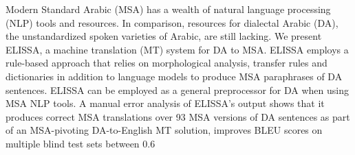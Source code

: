 Modern Standard Arabic (MSA) has a wealth of natural language processing (NLP) tools
 and resources. In comparison, resources for
 dialectal Arabic (DA), the unstandardized spoken
 varieties of Arabic, are still lacking. We
 present ELISSA, a machine translation (MT)
 system for DA to MSA. ELISSA employs a
 rule-based approach that relies on morphological
 analysis, transfer rules and dictionaries
 in addition to language models to produce
 MSA paraphrases of DA sentences. ELISSA
 can be employed as a general preprocessor for
 DA when using MSA NLP tools. A manual
 error analysis of ELISSA's output shows
 that it produces correct MSA translations over
 93%
 MSA versions of DA sentences as part of
 an MSA-pivoting DA-to-English MT solution,
 improves BLEU scores on multiple blind test
 sets between 0.6%

